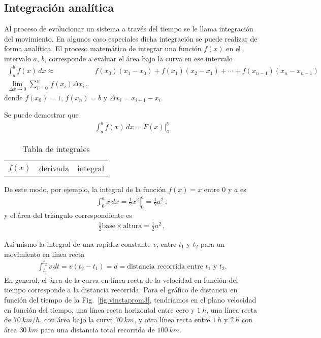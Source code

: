 \subsection{Integración analítica}
Al proceso de evolucionar un sistema a través del tiempo se le llama
integración del movimiento. En algunos caso especiales dicha
integración se puede realizar de forma analítica. El proceso
matemático de integrar una función $f(x)$ en el intervalo $a$, $b$, corresponde a evaluar el área bajo la curva en ese intervalo
\begin{align}
  \int_a^b f(x)\,dx\approx&f(x_0)(x_1-x_0)+f(x_1)(x_2-x_1)+\cdots+f(x_{n-1})(x_n-x_{n-1}) \nonumber\\
\lim_{\Delta x\to 0}\sum_{i=0}^n\,f(x_i)\Delta x_i\,,
\end{align}
donde $f(x_0)=1$, $f(x_{n})=b$ y $\Delta x_i=x_{i+1}-x_i$.

Se puede demostrar que
\begin{align}
  \int_a^b f(x)\,dx=\left. F(x)  \right|_a^b
\end{align}


\begin{table}
  \centering
  \begin{tabular}{lll}
    $f(x)$ & derivada & integral\\
  \end{tabular}
  \caption{Tabla de integrales}
\end{table}

De este modo, por ejemplo, la integral de la función $f(x)=x$ entre $0$ y $a$ es
\begin{align}
  \int_0^a x\,dx=\left.\frac{1}{2}x^2\right|_0^a=\frac{1}{2}a^2\,,
\end{align}
y el área del triángulo correspondiente es
\begin{align}
  \frac{1}{2}\text{base}\times\text{altura}=\frac{1}{2}a^2\,,
\end{align}

Así mismo la integral de una rapidez constante $v$, entre $t_1$ y $t_2$ para un movimiento en línea recta
\begin{align}
  \int_{t_1}^{t_2}v \,dt=v(t_2-t_1)=d=\text{distancia recorrida entre $t_1$ y $t_2$.}
\end{align}
En general, el área de la curva en línea recta de la velocidad en
función del tiempo corresponde a la distancia recorrida. Para el
gráfico de distancia en función del tiempo de la
Fig.~\ref{fig:vinstaprom3}, tendríamos en el plano velocidad en
función del tiempo, una línea recta horizontal entre cero y
$\SI{1}{h}$, una línea recta de $\SI{70}{km/h}$, con área bajo la
curva $\SI{70}{km}$, y otra línea recta entre $\SI{1}{h}$ y
$\SI{2}{h}$ con área $\SI{30}{km}$ para una distancia total recorrida
de $\SI{100}{km}$.

